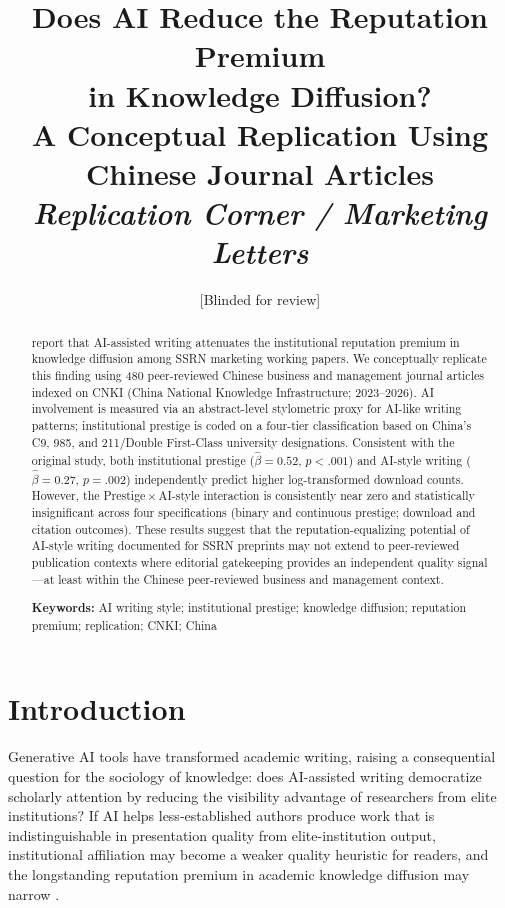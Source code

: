 \documentclass[12pt,a4paper]{article}
\title{\textbf{Does AI Reduce the Reputation Premium\\
in Knowledge Diffusion?\\
A Conceptual Replication Using Chinese Journal Articles}\\[0.8em]
\large\textit{Replication Corner / Marketing Letters}}
\author{[Blinded for review]}
\date{}
\begin{document}
\maketitle

\begin{abstract}
\noindent
\citet{JoLi2026} report that AI-assisted writing attenuates the
institutional reputation premium in knowledge diffusion among SSRN
marketing working papers.
We conceptually replicate this finding using 480 peer-reviewed Chinese
business and management journal articles indexed on CNKI
(China National Knowledge Infrastructure; 2023--2026).
AI involvement is measured via an abstract-level stylometric proxy for
AI-like writing patterns; institutional prestige is coded on a four-tier
classification based on China's C9, 985, and 211/Double First-Class
university designations.
Consistent with the original study, both institutional prestige
($\hat{\beta}=0.52$, $p<.001$) and AI-style writing
($\hat{\beta}=0.27$, $p=.002$) independently predict higher
log-transformed download counts.
However, the Prestige\,$\times$\,AI-style interaction is consistently
near zero and statistically insignificant across four specifications
(binary and continuous prestige; download and citation outcomes).
These results suggest that the reputation-equalizing
potential of AI-style writing documented for SSRN preprints may not
extend to peer-reviewed publication contexts where editorial gatekeeping
provides an independent quality signal---at least within the Chinese peer-reviewed business and management context.

\smallskip\noindent
\textbf{Keywords:} AI writing style; institutional prestige; knowledge
diffusion; reputation premium; replication; CNKI; China
\end{abstract}

\newpage

\section{Introduction}
\label{sec:intro}

Generative AI tools have transformed academic writing, raising a
consequential question for the sociology of knowledge: does AI-assisted
writing democratize scholarly attention by reducing the visibility
advantage of researchers from elite institutions?
If AI helps less-established authors produce work that is
indistinguishable in presentation quality from elite-institution output,
institutional affiliation may become a weaker quality heuristic for
readers, and the longstanding reputation premium in academic knowledge
diffusion may narrow
\citep{Merton1968,Spence1973,DiMaggio1983}.
\end{document}
